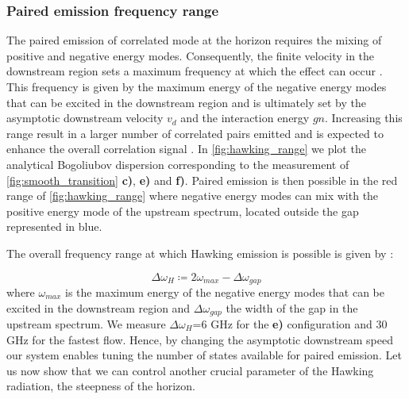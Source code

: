 \subsubsection{Paired emission frequency range}

The paired emission of correlated mode at the horizon requires the mixing of positive and negative energy modes. Consequently, the finite velocity in the downstream region 
sets a maximum frequency at which the effect can occur \cite{jacquet_hawking_2019}. This frequency is given by the maximum energy of the negative energy modes that can be excited in the downstream region and is ultimately 
set by the asymptotic downstream velocity $v_d$ and the interaction energy $gn$. Increasing this range result in a larger number of correlated pairs emitted and is expected to enhance
the overall correlation signal \cite{jacquet_hawking_2019}. 
In \autoref{fig:hawking_range} we plot the analytical Bogoliubov dispersion corresponding to the measurement of \autoref{fig:smooth_transition} \textbf{c)}, \textbf{e)} and \textbf{f)}.  Paired emission is then possible in the red range of \autoref{fig:hawking_range}  where negative energy modes
can mix with the positive energy mode of the upstream spectrum, located outside the gap represented in blue.

The overall frequency range at which Hawking emission is possible is given by :

\begin{equation}
    \Delta \omega_H \coloneqq  2\omega_{max}- \Delta\omega_{gap}
    \label{eq:hawking_range}
\end{equation}
where $\omega_{max}$ is the maximum energy of the negative energy modes that can be excited in the downstream region and $\Delta\omega_{gap}$ the width 
of the gap in the upstream spectrum. We measure $\Delta \omega_H$=6 GHz for the \textbf{e)} configuration and 30 GHz for the fastest flow. 
Hence, by changing the asymptotic downstream speed our system enables tuning the number of states available for paired emission. Let us now 
show that we can control another crucial parameter of the Hawking radiation, the steepness of the horizon.

